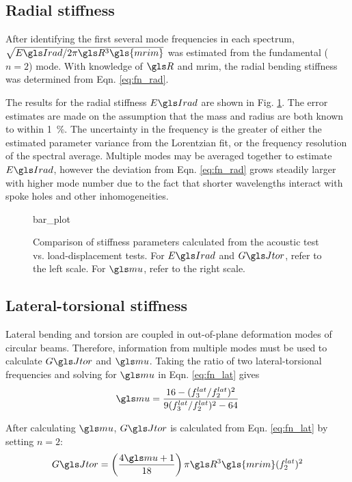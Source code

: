 \documentclass[../thesis.tex]{subfiles}
\begin{document}
\subsection{Radial stiffness}

After identifying the first several mode frequencies in each spectrum, $\sqrt{\EIr/2\pi \R^3 \gls{mrim}}$ was estimated from the fundamental ($n=2$) mode. With knowledge of $\R$ and \gls{mrim}, the radial bending stiffness was determined from Eqn. \eqref{eq:fn_rad}.

The results for the radial stiffness $\EIr$ are shown in Fig. \ref{fig:bar}. The error estimates are made on the assumption that the mass and radius are both known to within \SI{1}{\percent}. The uncertainty in the frequency is the greater of either the estimated parameter variance from the Lorentzian fit, or the frequency resolution of the spectral average. Multiple modes may be averaged together to estimate $\EIr$, however the deviation from Eqn. \eqref{eq:fn_rad} grows steadily larger with higher mode number due to the fact that shorter wavelengths interact with spoke holes and other inhomogeneities.

\begin{figure}
{bar_plot}
\caption[Results from acoustic and mechanical tests on rims]{Comparison of stiffness parameters calculated from the acoustic test vs. load-displacement tests. For $\EIr$ and $\GJ$, refer to the left scale. For $\m$, refer to the right scale.}
\label{fig:bar}
\end{figure}

\subsection{Lateral-torsional stiffness}

Lateral bending and torsion are coupled in out-of-plane deformation modes of circular beams. Therefore, information from multiple modes must be used to calculate $\GJ$ and $\m$. Taking the ratio of two lateral-torsional frequencies and solving for $\m$ in Eqn. \eqref{eq:fn_lat} gives
\begin{equation}\label{eq:mu}
\m = \frac{16 - (f_3^{lat}/f_2^{lat})^2}{9(f_3^{lat}/f_2^{lat})^2 - 64}
\end{equation}

After calculating $\m$, $\GJ$ is calculated from Eqn. \eqref{eq:fn_lat} by setting $n=2$:
\begin{equation}\label{eq:GJ}
\GJ = \left(\frac{4\m + 1}{18} \right ) \pi \R^3 \gls{mrim} (f_2^{lat})^2
\end{equation}
\end{document}
